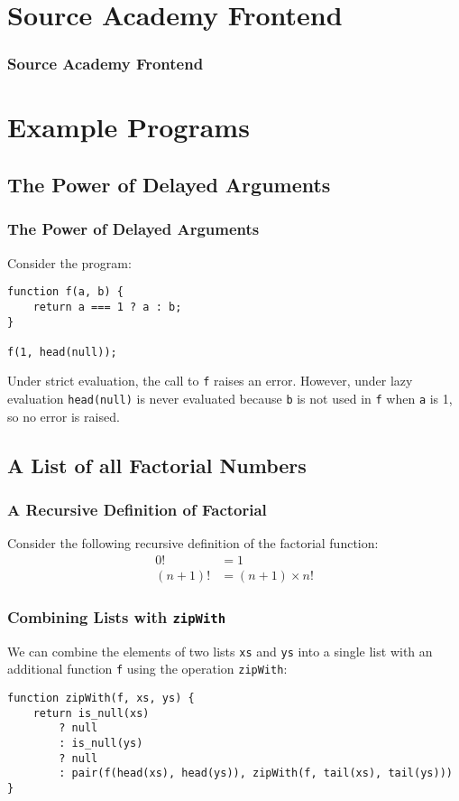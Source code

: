\documentclass[12pt]{beamer}
\begin{document}
\section{Source Academy Frontend}

\begin{frame}
\frametitle{Source Academy Frontend}
\end{frame}

\section{Example Programs}

\subsection{The Power of Delayed Arguments}

\begin{frame}[fragile]
\frametitle{The Power of Delayed Arguments}
Consider the program:
\begin{lstlisting}
function f(a, b) {
	return a === 1 ? a : b;
}

f(1, head(null));
\end{lstlisting}\pause
Under strict evaluation, the call to \texttt{f} raises an error. However, under lazy evaluation \texttt{head(null)} is never evaluated because \texttt{b} is not used in \texttt{f} when \texttt{a} is 1, so no error is raised.
\end{frame}

\subsection{A List of all Factorial Numbers}

\begin{frame}
\frametitle{A Recursive Definition of Factorial}
Consider the following recursive definition of the factorial function:
\begin{align*}
0! &= 1 \\
(n+1)! &= (n+1)\times n!
\end{align*}
\end{frame}

\begin{frame}[fragile]
\frametitle{Combining Lists with \texttt{zipWith}}
We can combine the elements of two lists \texttt{xs} and \texttt{ys} into a single list with an additional function \texttt{f} using the operation \texttt{zipWith}:
\begin{lstlisting}
function zipWith(f, xs, ys) {
	return is_null(xs)
		? null
		: is_null(ys)
		? null
		: pair(f(head(xs), head(ys)), zipWith(f, tail(xs), tail(ys)))
}
\end{lstlisting}
\end{frame}
\end{document}

